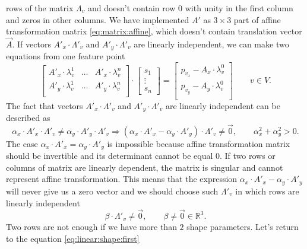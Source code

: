 rows of the matrix $\Lambda_v$ and doesn't contain row $0$
with unity in the first column and zeros in other columns.
We have implemented $A'$ as $3 \times 3$ part of
affine transformation matrix \eqref{eq:matrix:affine},
which doesn't contain translation vector $\vec{A}$.
If vectors $A'_x \cdot \Lambda'_v$ and $A'_y \cdot \Lambda'_v$
are linearly independent,
we can make two equations from one feature point
\begin{equation*}
  \begin{bmatrix}
    A'_x \cdot \lambda^1_v & \dots & A'_x \cdot \lambda^n_v \\
    A'_y \cdot \lambda^1_v & \dots & A'_y \cdot \lambda^n_v \\
  \end{bmatrix}
  \cdot \begin{bmatrix}
    s_1 \\
    \vdots \\
    s_n
  \end{bmatrix}
  = \begin{bmatrix}
    p_{v_x} - A_x \cdot \lambda^0_v \\
    p_{v_y} - A_y \cdot \lambda^0_v \\
  \end{bmatrix}
  \qquad v \in V.
\end{equation*}
The fact that vectors $A'_x \cdot \Lambda'_v$ and $A'_y \cdot \Lambda'_v$
are linearly independent can be described as
\begin{equation*}
  \alpha_x \cdot A'_x \cdot \Lambda'_v
    \neq \alpha_y \cdot A'_y \cdot \Lambda'_v
  \Rightarrow
  \left( \alpha_x \cdot A'_x - \alpha_y \cdot A'_y \right) \cdot \Lambda'_v
    \neq \vec{0},
  \qquad \alpha_x^2 + \alpha_y^2 > 0.
\end{equation*}
The case $\alpha_x \cdot A'_x = \alpha_y \cdot A'_y$ is impossible
because affine transformation matrix should be invertible
and its determinant cannot be equal $0$.
If two rows or columns of matrix are linearly dependent,
the matrix is singular and cannot represent affine transformation.
This means that the expression $\alpha_x \cdot A'_x - \alpha_y \cdot A'_y$
will never give us a zero vector and we should choose such $\Lambda'_v$
in which rows are linearly independent
\begin{equation*}
  \beta \cdot \Lambda'_v \neq \vec{0},
  \qquad \beta \neq \vec{0} \in \mathbb{R}^3.
\end{equation*}
Two rows are not enough if we have more than $2$ shape parameters.
Let's return to the equation \eqref{eq:linear:shape:first}
